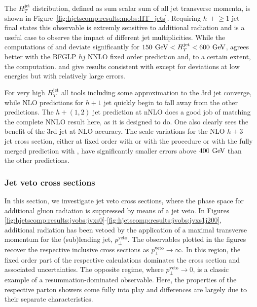 The $H_T^\text{jet}$ distribution, defined as sum scalar sum of all jet 
transverse momenta, is shown in Figure~\ref{fig:hjetscomp:results:mobs:HT_jets}. 
Requiring $h\,+\!\ge\!\!1$-jet final states this observable is
extremly sensitive to additional radiation and is a useful case to observe
the impact of different jet multiplicities. While the \hjetscompNNLOPS 
computations of \hjetscompSherpa and \hjetscompPowheg deviate significantly for 
$150\,\text{\:GeV} < H_T^\text{jet} < 600\,\text{\:GeV}$, \hjetscompSherpa \hjetscompNNLOPS agrees better with 
the BFGLP $hj$ NNLO fixed order prediction and, to a certain extent, 
the \hjetscompSherpa \hjetscompMEPSatNLO computation. \hjetscompHerwig and \hjetscompMGaMC give results 
consistent with \hjetscompPowheg except for deviations at low energies but with 
relatively large errors.

For very high $H_T^\text{jet}$ all tools including some approximation to the 3rd
jet converge, while NLO predictions for $h+1$ jet quickly begin to fall away
from the other predictions. The \hjetscompLoopsim $h+(1,2)$ jet prediction at nNLO does a good
job of matching the complete NNLO result here, as it is designed to do. One also
clearly sees the benefit of the 3rd jet at NLO accuracy.  The scale variations
for the NLO $h+3$ jet cross section,  either at fixed order with \hjetscompLoopsim or  with the \hjetscompMinlo
procedure or with the fully merged prediction with \hjetscompSherpa \hjetscompMEPSatNLO, have
significantly smaller errors above $400\,\text{\:GeV}$ than the other predictions.



\clearpage
\subsubsection{Jet veto cross sections}
\label{sec:hjetscomp:results:jvobs}


In this section, we investigate jet veto cross sections, where the phase space for
additional gluon radiation is suppressed by means of a jet veto. 
In  Figures 
\ref{fig:hjetscomp:results:jvobs:jvxs0}-\ref{fig:hjetscomp:results:jvobs:jvxs1j200}, 
additional radiation has been vetoed by the application of a maximal transverse 
momentum for the (sub)leading jet, $p_\perp^\text{veto}$. The observables plotted
in the figures recover the respective inclusive cross sections as 
$p_\perp^\text{veto}\to\infty$. In this region, the fixed order 
part of the respective calculations dominates the cross section 
and associated uncertainties. The opposite regime, where $p_\perp^\text{veto}\to 0$, 
is a classic example of a resummation-dominated observable. Here, the 
properties of the respective parton showers come fully into play and 
differences are largely due to their separate characteristics. 


